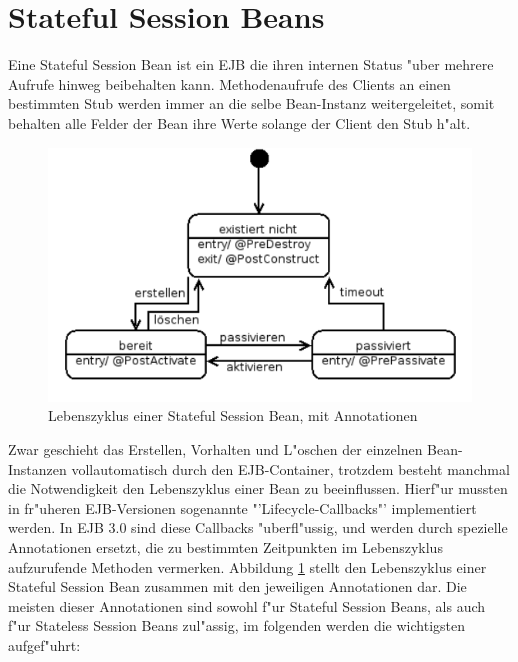 \section{Stateful Session Beans}
\label{sec:chap2:sfsb}

Eine Stateful Session Bean ist ein EJB die ihren internen Status "uber mehrere Aufrufe hinweg beibehalten kann.
Methodenaufrufe des Clients an einen bestimmten Stub werden immer an die selbe Bean-Instanz weitergeleitet, somit
behalten alle Felder der Bean ihre Werte solange der Client den Stub h"alt.
\begin{figure}[h]
\includegraphics[width=\textwidth]{chap2/img/sfsbstates.png}
\caption{Lebenszyklus einer Stateful Session Bean, mit Annotationen}
\label{fig:sfsbstates}
\end{figure}
Zwar geschieht das Erstellen, Vorhalten und L"oschen der einzelnen Bean-Instanzen vollautomatisch durch den EJB-Container, 
trotzdem besteht manchmal die Notwendigkeit den Lebenszyklus einer Bean zu beeinflussen. Hierf"ur mussten in fr"uheren
EJB-Versionen sogenannte "'Lifecycle-Callbacks"' implementiert werden. In EJB 3.0 sind diese Callbacks "uberfl"ussig,
und werden durch spezielle Annotationen ersetzt, die zu bestimmten Zeitpunkten im Lebenszyklus aufzurufende Methoden
vermerken. Abbildung \ref{fig:sfsbstates} stellt den Lebenszyklus einer Stateful Session Bean zusammen mit den jeweiligen
Annotationen dar.
Die meisten dieser Annotationen sind sowohl f"ur Stateful Session Beans, als auch f"ur Stateless Session Beans zul"assig,
im folgenden werden die wichtigsten aufgef"uhrt:
